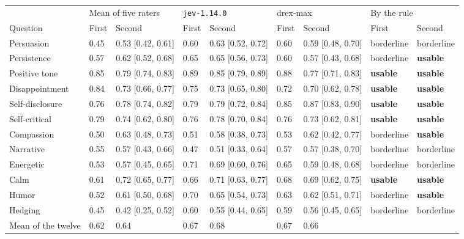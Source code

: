 {\scriptsize\setlength{\tabcolsep}{3.5pt}
\begin{tabular}{@{}l l l l l l l l l@{}}
\toprule
 & \multicolumn{2}{l}{Mean of five raters} & \multicolumn{2}{l}{\texttt{jev-1.14.0}} & \multicolumn{2}{l}{drex-max} & \multicolumn{2}{l}{By the rule} \\
\cmidrule(r){2-3}\cmidrule(r){4-5}\cmidrule(r){6-7}\cmidrule{8-9}
Question & First & Second & First & Second & First & Second & First & Second \\
\midrule
Persuasion & 0.45 & 0.53 {\scriptsize[0.42, 0.61]} & 0.60 & 0.63 {\scriptsize[0.52, 0.72]} & 0.60 & 0.59 {\scriptsize[0.48, 0.70]} & borderline & borderline \\
Persistence & 0.57 & 0.62 {\scriptsize[0.52, 0.68]} & 0.65 & 0.65 {\scriptsize[0.56, 0.73]} & 0.60 & 0.57 {\scriptsize[0.43, 0.68]} & borderline & \textbf{usable} \\
Positive tone & 0.85 & 0.79 {\scriptsize[0.74, 0.83]} & 0.89 & 0.85 {\scriptsize[0.79, 0.89]} & 0.88 & 0.77 {\scriptsize[0.71, 0.83]} & \textbf{usable} & \textbf{usable} \\
Disappointment & 0.84 & 0.73 {\scriptsize[0.66, 0.77]} & 0.75 & 0.73 {\scriptsize[0.65, 0.80]} & 0.72 & 0.70 {\scriptsize[0.62, 0.78]} & \textbf{usable} & \textbf{usable} \\
Self-disclosure & 0.76 & 0.78 {\scriptsize[0.74, 0.82]} & 0.79 & 0.79 {\scriptsize[0.72, 0.84]} & 0.85 & 0.87 {\scriptsize[0.83, 0.90]} & \textbf{usable} & \textbf{usable} \\
Self-critical & 0.79 & 0.74 {\scriptsize[0.62, 0.80]} & 0.76 & 0.78 {\scriptsize[0.70, 0.84]} & 0.76 & 0.73 {\scriptsize[0.62, 0.81]} & \textbf{usable} & \textbf{usable} \\
Compassion & 0.50 & 0.63 {\scriptsize[0.48, 0.73]} & 0.51 & 0.58 {\scriptsize[0.38, 0.73]} & 0.53 & 0.62 {\scriptsize[0.42, 0.77]} & borderline & \textbf{usable} \\
Narrative & 0.55 & 0.57 {\scriptsize[0.43, 0.66]} & 0.47 & 0.51 {\scriptsize[0.33, 0.64]} & 0.57 & 0.57 {\scriptsize[0.38, 0.70]} & borderline & borderline \\
Energetic & 0.53 & 0.57 {\scriptsize[0.45, 0.65]} & 0.71 & 0.69 {\scriptsize[0.60, 0.76]} & 0.65 & 0.59 {\scriptsize[0.48, 0.68]} & borderline & borderline \\
Calm & 0.61 & 0.72 {\scriptsize[0.65, 0.77]} & 0.66 & 0.71 {\scriptsize[0.63, 0.77]} & 0.68 & 0.69 {\scriptsize[0.62, 0.75]} & \textbf{usable} & \textbf{usable} \\
Humor & 0.52 & 0.61 {\scriptsize[0.50, 0.68]} & 0.70 & 0.65 {\scriptsize[0.54, 0.73]} & 0.63 & 0.62 {\scriptsize[0.51, 0.71]} & borderline & \textbf{usable} \\
Hedging & 0.45 & 0.42 {\scriptsize[0.25, 0.52]} & 0.60 & 0.55 {\scriptsize[0.44, 0.65]} & 0.59 & 0.56 {\scriptsize[0.45, 0.65]} & borderline & borderline \\
\midrule
Mean of the twelve & 0.62 & 0.64 & 0.67 & 0.68 & 0.67 & 0.66 & & \\
\bottomrule
\end{tabular}}
